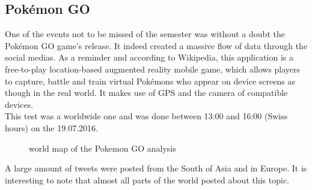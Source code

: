 \documentclass[a4paper,11pt]{report}
\begin{document}
\subsection{Pokémon GO}
One of the events not to be missed of the semester was without a doubt the Pokémon GO game's release. It indeed created a massive flow of data through the social medias. As a reminder and according to Wikipedia, this application is a free-to-play location-based augmented reality mobile game, which allows players to capture, battle and train virtual Pokémons who appear on device screens as though in the real world. It makes use of GPS and the camera of compatible devices.\\

This test was a worldwide one and was done between 13:00 and 16:00 (Swiss hours) on the 19.07.2016.
\begin{figure}[H]
\vspace{-5pt}
\begin{center}
\vspace{-20pt}
\caption{world map of the Pokemon GO analysis}
\end{center}
\end{figure}
\vspace{-10pt}

A large amount of tweets were posted from the South of Asia and in Europe. It is interesting to note that almost all parts of the world posted about this topic.
\end{document}
